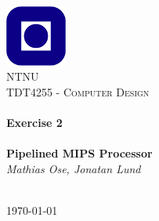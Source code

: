 \begin{titlepage}
\begin{center}
\includegraphics[width=0.15\textwidth]{img/NTNU.png}~\\[1cm]

\textsc{\LARGE NTNU}\\[1.5cm]

\textsc{\Large TDT4255 - Computer Design}\\[0.5cm]

\HRule \\[0.4cm]
{ \huge \bfseries Exercise 2 \\~\\  Pipelined MIPS Processor}\\[0.5cm]
{\large \textit{Mathias Ose, Jonatan Lund}}\\[0.2cm]
\HRule \\[1.5cm]



\vfill

{\large \today}
\end{center}
\end{titlepage}
